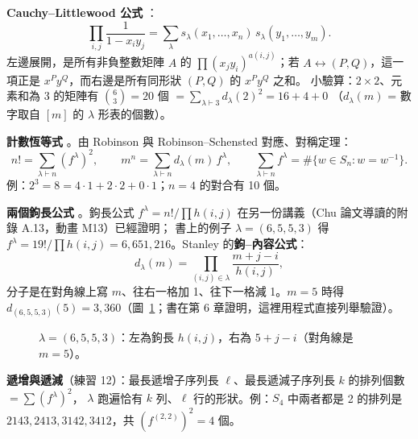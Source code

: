 \textbf{Cauchy–Littlewood 公式} ：
\[
\prod_{i,j}\frac{1}{1-x_i y_j}=\sum_\lambda s_\lambda(x_1,\ldots,x_n)\,s_\lambda(y_1,\ldots,y_m).
\]
左邊展開，是所有非負整數矩陣 $A$ 的 $\prod(x_jy_i)^{a(i,j)}$；若 $A\leftrightarrow(P,Q)$，這一項正是 $x^Py^Q$，而右邊是所有同形狀 $(P,Q)$ 的 $x^Py^Q$ 之和。
小驗算：$2\times2$、元素和為 3 的矩陣有 $\binom{6}{3}=20$ 個 $=\sum_{\lambda\vdash3}d_\lambda(2)^2=16+4+0$
（$d_\lambda(m)$ = 數字取自 $[m]$ 的 $\lambda$ 形表的個數）。

\textbf{計數恆等式} 。由 Robinson 與 Robinson–Schensted 對應、對稱定理：
\[
n!=\sum_{\lambda\vdash n}(f^\lambda)^2,\qquad m^n=\sum_{\lambda\vdash n}d_\lambda(m)\,f^\lambda,\qquad
\sum_{\lambda\vdash n}f^\lambda=\#\{w\in S_n:w=w^{-1}\}.
\]
例：$2^3=8=4\cdot1+2\cdot2+0\cdot1$；$n=4$ 的對合有 10 個。

\textbf{兩個鉤長公式} 。鉤長公式 $f^\lambda=n!/\prod h(i,j)$ 在另一份講義（Chu 論文導讀的附錄 A.13，動畫 M13）已經證明；
書上的例子 $\lambda=(6,5,5,3)$ 得 $f^\lambda=19!/\prod h(i,j)=6{,}651{,}216$。Stanley 的\textbf{鉤–內容公式}：
\[
d_\lambda(m)=\prod_{(i,j)\in\lambda}\frac{m+j-i}{h(i,j)} ,
\]
分子是在對角線上寫 $m$、往右一格加 1、往下一格減 1。$m=5$ 時得 $d_{(6,5,5,3)}(5)=3{,}360$（圖~\ref{fig:f-hook}；書在第 6 章證明，這裡用程式直接列舉驗證）。

\begin{figure}[H]
\centering
\FulHook
\caption{$\lambda=(6,5,5,3)$：左為鉤長 $h(i,j)$，右為 $5+j-i$（\colorbox{cB!35}{對角線}是 $m=5$）。}
\label{fig:f-hook}
\end{figure}

\textbf{遞增與遞減}（練習 12）：最長遞增子序列長 $\ell$、最長遞減子序列長 $k$ 的排列個數 $=\sum(f^\lambda)^2$，
$\lambda$ 跑遍恰有 $k$ 列、$\ell$ 行的形狀。例：$S_4$ 中兩者都是 2 的排列是 $2143,2413,3142,3412$，共 $(f^{(2,2)})^2=4$ 個。
